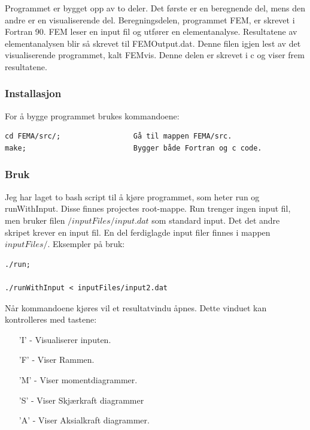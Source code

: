 \documentclass[10pt,a4paper, norsk]{article}
\begin{document}
Programmet er bygget opp av to deler. Det første er en beregnende del, mens den andre er en visualiserende del. Beregningsdelen, programmet FEM, er skrevet i  Fortran 90. FEM leser en input fil og utfører en elementanalyse. Resultatene av elementanalysen blir så skrevet til FEMOutput.dat. Denne filen igjen lest av det visualiserende programmet, kalt FEMvis. Denne delen er skrevet i c og viser frem resultatene.





\subsubsection{Installasjon}
For å bygge programmet brukes kommandoene:

\begin{verbatim}
cd FEMA/src/;                 Gå til mappen FEMA/src.
make;                         Bygger både Fortran og c code.
\end{verbatim}

\subsubsection{Bruk} 
Jeg har laget to bash script til å kjøre programmet, som heter run og runWithInput. Disse finnes projectes root-mappe.  Run trenger ingen input fil, men bruker filen $/inputFiles/input.dat$ som standard input. Det det andre skripet krever en input fil. En del ferdiglagde input filer finnes i mappen $inputFiles/$.
Eksempler på bruk:

\begin{verbatim}
./run;

./runWithInput < inputFiles/input2.dat
\end{verbatim}

Når kommandoene kjøres vil et resultatvindu åpnes. Dette vinduet kan kontrolleres med tastene: 

\begin{itemize}
\setlength{\itemsep}{0cm}%
\setlength{\parskip}{0cm}%
\item['I'] - Visualiserer inputen.
\item['F'] - Viser Rammen.
\item['M'] - Viser momentdiagrammer.
\item['S'] - Viser Skjærkraft diagrammer
\item['A'] - Viser Aksialkraft diagrammer.
\end{itemize}
\end{document}

